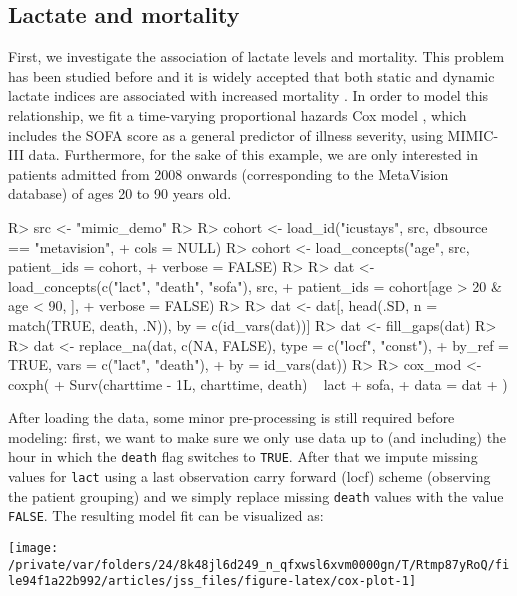 \documentclass[
  notitle]{jss}
\begin{document}
\hypertarget{lactate-and-mortality}{%
\subsection{Lactate and mortality}\label{lactate-and-mortality}}

First, we investigate the association of lactate levels and mortality.
This problem has been studied before and it is widely accepted that both
static and dynamic lactate indices are associated with increased
mortality \citep{haas2016, nichol2011, van2013}. In order to model this
relationship, we fit a time-varying proportional hazards Cox model
\citep{therneau2000, therneau2015}, which includes the SOFA score as a
general predictor of illness severity, using MIMIC-III data.
Furthermore, for the sake of this example, we are only interested in
patients admitted from 2008 onwards (corresponding to the MetaVision
database) of ages 20 to 90 years old.

\begin{CodeChunk}
\begin{CodeInput}
R> src <- "mimic_demo"
R> 
R> cohort <- load_id("icustays", src, dbsource == "metavision",
+                   cols = NULL)
R> cohort <- load_concepts("age", src, patient_ids = cohort,
+                         verbose = FALSE)
R> 
R> dat <- load_concepts(c("lact", "death", "sofa"), src,
+                      patient_ids = cohort[age > 20 & age < 90, ],
+                      verbose = FALSE)
R> 
R> dat <- dat[, head(.SD, n = match(TRUE, death, .N)), by = c(id_vars(dat))]
R> dat <- fill_gaps(dat)
R> 
R> dat <- replace_na(dat, c(NA, FALSE), type = c("locf", "const"),
+                   by_ref = TRUE, vars = c("lact", "death"),
+                   by = id_vars(dat))
R> 
R> cox_mod <- coxph(
+   Surv(charttime - 1L, charttime, death) ~ lact + sofa,
+   data = dat
+ )
\end{CodeInput}
\end{CodeChunk}

After loading the data, some minor pre-processing is still required
before modeling: first, we want to make sure we only use data up to (and
including) the hour in which the \texttt{death} flag switches to
\texttt{TRUE}. After that we impute missing values for \texttt{lact}
using a last observation carry forward (locf) scheme (observing the
patient grouping) and we simply replace missing \texttt{death} values
with the value \texttt{FALSE}. The resulting model fit can be visualized
as:

\begin{CodeChunk}


\begin{center}\texttt{[image: /private/var/folders/24/8k48jl6d249\_n\_qfxwsl6xvm0000gn/T/Rtmp87yRoQ/file94f1a22b992/articles/jss\_files/figure-latex/cox-plot-1]} \end{center}

\end{CodeChunk}
\end{document}

